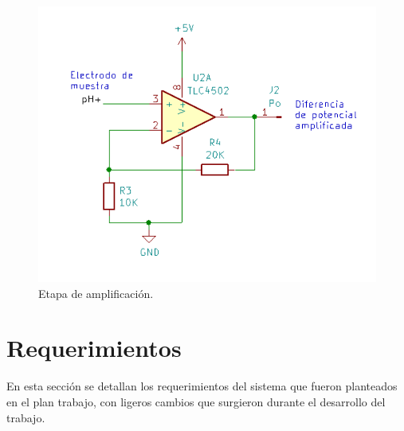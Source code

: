 \begin{figure}[htbp]
	\centering
	\includegraphics[width=.7\textwidth]{./Figures/etapaAmpli.png}
	\caption{Etapa de amplificación.}
	\label{fig:etapaAmpli}
\end{figure}

\vspace{1,5 cm}

\section{Requerimientos}
\label{sec:requerimientos}

En esta sección se detallan los requerimientos del sistema que fueron planteados en el plan trabajo, con ligeros cambios que surgieron durante el desarrollo del trabajo.

